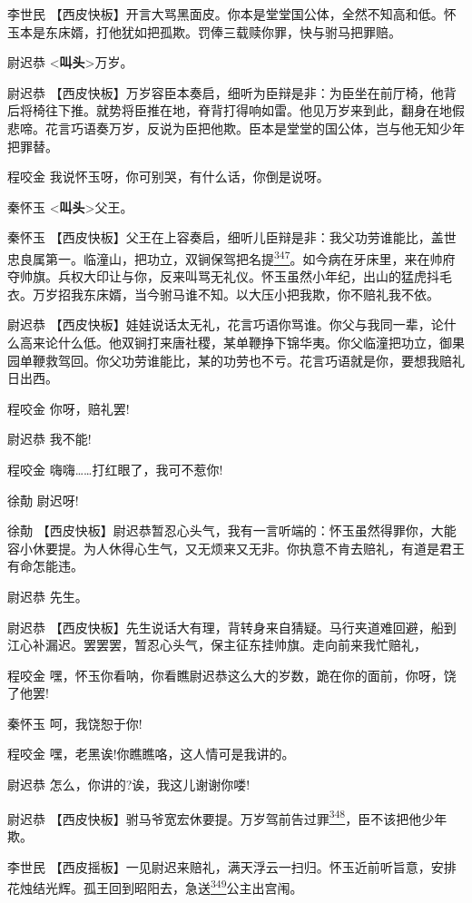 李世民
【西皮快板】开言大骂黑面皮。你本是堂堂国公体，全然不知高和低。怀玉本是东床婿，打他犹如把孤欺。罚俸三载赎你罪，快与驸马把罪赔。

尉迟恭 \textless{}\textbf{叫头}\textgreater{}万岁。

尉迟恭
【西皮快板】万岁容臣本奏启，细听为臣辩是非：为臣坐在前厅椅，他背后将椅往下推。就势将臣推在地，脊背打得响如雷。他见万岁来到此，翻身在地假悲啼。花言巧语奏万岁，反说为臣把他欺。臣本是堂堂的国公体，岂与他无知少年把罪替。

程咬金 我说怀玉呀，你可别哭，有什么话，你倒是说呀。

秦怀玉 \textless{}\textbf{叫头}\textgreater{}父王。

秦怀玉
【西皮快板】父王在上容奏启，细听儿臣辩是非：我父功劳谁能比，盖世忠良属第一。临潼山，把功立，双锏保驾把名提\protect\hyperlink{fn347}{\textsuperscript{347}}。如今病在牙床里，来在帅府夺帅旗。兵权大印让与你，反来叫骂无礼仪。怀玉虽然小年纪，出山的猛虎抖毛衣。万岁招我东床婿，当今驸马谁不知。以大压小把我欺，你不赔礼我不依。

尉迟恭
【西皮快板】娃娃说话太无礼，花言巧语你骂谁。你父与我同一辈，论什么高来论什么低。他双锏打来唐社稷，某单鞭挣下锦华夷。你父临潼把功立，御果园单鞭救驾回。你父功劳谁能比，某的功劳也不亏。花言巧语就是你，要想我赔礼日出西。

程咬金 你呀，赔礼罢!

尉迟恭 我不能!

程咬金 嗨嗨\ldots{}\ldots{}打红眼了，我可不惹你!

徐勣 尉迟呀!

徐勣
【西皮快板】尉迟恭暂忍心头气，我有一言听端的：怀玉虽然得罪你，大能容小休要提。为人休得心生气，又无烦来又无非。你执意不肯去赔礼，有道是君王有命怎能违。

尉迟恭 先生。

尉迟恭
【西皮快板】先生说话大有理，背转身来自猜疑。马行夹道难回避，船到江心补漏迟。罢罢罢，暂忍心头气，保主征东挂帅旗。走向前来我忙赔礼，

程咬金
嘿，怀玉你看呐，你看瞧尉迟恭这么大的岁数，跪在你的面前，你呀，饶了他罢!

秦怀玉 呵，我饶恕于你!

程咬金 嘿，老黑诶!你瞧瞧咯，这人情可是我讲的。

尉迟恭 怎么，你讲的?诶，我这儿谢谢你喽!

尉迟恭
【西皮快板】驸马爷宽宏休要提。万岁驾前告过罪\protect\hyperlink{fn348}{\textsuperscript{348}}，臣不该把他少年欺。

李世民
【西皮摇板】一见尉迟来赔礼，满天浮云一扫归。怀玉近前听旨意，安排花烛结光辉。孤王回到昭阳去，急送\protect\hyperlink{fn349}{\textsuperscript{349}}公主出宫闱。

